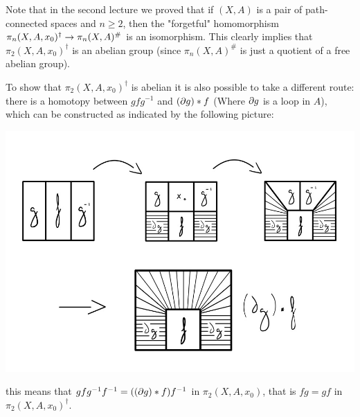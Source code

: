\documentclass[a4paper,11pt,english]{article}
\begin{document}
\newpage
\begin{exercise}[3]

Note that in the second lecture we proved that if $(X,A)$ is a pair of path-connected spaces and $n\geq2$, then the "forgetful" homomorphism $\pi_n(X,A,x_0)^\dagger\to\pi_n(X,A)^\#$ is an isomorphism. This clearly implies that $\pi_2(X,A,x_0)^\dagger$ is an abelian group (since $\pi_n(X,A)^\#$ is just a quotient of a free abelian group).

To show that $\pi_2(X,A,x_0)^\dagger$ is abelian it is also possible to take a different route: there is a homotopy between $gfg^{-1}$ and $(\partial g)*f$ (Where $\partial g$ is a loop in $A$), which can be constructed as indicated by the following picture:\vspace{-0.3cm}
\begin{center}
    \includegraphics[scale=0.38]{Some_homotopy.jpg}
\end{center}
this means that $gfg^{-1}f^{-1}=((\partial g)*f)f^{-1}$ in $\pi_2(X,A,x_0)$, that is $fg=gf$ in $\pi_2(X,A,x_0)^\dagger$.

\end{exercise}
\end{document}
